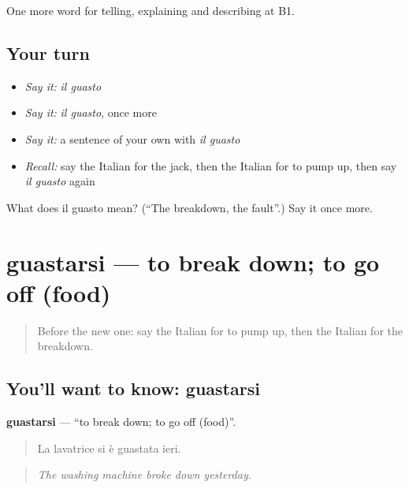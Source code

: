 \begin{grammarlens}[title={What you've built}]
One more word for telling, explaining and describing at B1.
\end{grammarlens}

\subsection*{Your turn}
\begin{itemize}
\raggedright
  \item \emph{Say it:} \emph{il guasto}
  \item \emph{Say it:} \emph{il guasto}, once more
  \item \emph{Say it:} a sentence of your own with \emph{il guasto}
  \item \emph{Recall:} say the Italian for the jack, then the Italian for to pump up, then say \emph{il guasto} again
\end{itemize}

\begin{tcolorbox}[breakable,colback=teal!4,colframe=teal!35!black,title={Before you move on}]
What does il guasto mean? (\textquotedblleft{}The breakdown, the fault\textquotedblright{}.) Say it once more.
\end{tcolorbox}
\section[guastarsi]{guastarsi — to break down; to go off (food)}

\label{lesson:IT-C410-guastarsi}



\begin{quote}
Before the new one: say the Italian for to pump up, then the Italian for the breakdown.
\end{quote}

\subsection*{You'll want to know: guastarsi}
\textbf{guastarsi} — \textquotedblleft{}to break down; to go off (food)\textquotedblright{}.

\begin{quote}
La lavatrice si è guastata ieri.
\end{quote}

\begin{quote}
\emph{The washing machine broke down yesterday.}
\end{quote}

